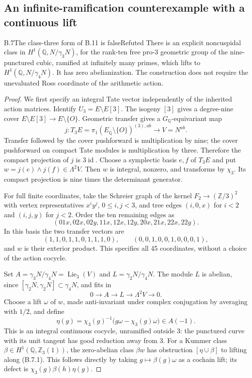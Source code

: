 \subsection{An infinite-ramification counterexample with a continuous lift}

\begin{statement}{B.7}{The class-three form of B.11 is false}{Refuted}
There is an explicit noncuspidal class in
$H^1(\mathbb Q,N/\gamma_3N)$, for the rank-ten free pro-$3$
geometric group of the nine-punctured cubic, ramified at infinitely
many primes, which lifts to $H^1(\mathbb Q,N/\gamma_4N)$.
It has zero abelianization. The construction does not require the
unevaluated Ross coordinate of the arithmetic action.
\end{statement}
\begin{proof}
We first specify an integral Tate vector independently of the inherited
action matrices. Identify $U_3=E\setminus E[3]$. The isogeny $[3]$
gives a degree-nine cover
$E\setminus E[3]\to E\setminus\{O\}$. Geometric transfer gives a
$G_{\mathbb Q}$-equivariant map
\[
 j:T_3E=\pi_1(E_{\overline{\mathbb Q}}\setminus\{O\})^{(3),ab}
       \longrightarrow V=N^{ab}.
\]
Transfer followed by the cover pushforward is multiplication by nine;
the cover pushforward on compact Tate modules is multiplication by
three. Therefore the compact projection of $j$ is $3\operatorname{id}$.
Choose a symplectic basis $e,f$ of $T_3E$ and put
$w=j(e)\wedge j(f)\in\Lambda^2V$. Then $w$ is integral, nonzero,
and transforms by $\chi_3$. Its compact projection is nine times the
determinant generator.

For full finite coordinates, take the Schreier graph of the kernel
$F_2\to(\mathbb Z/3)^2$ with vertex representatives $x^iy^j$,
$0\leq i,j<3$, and tree edges $(i,0,x)$ for $i<2$ and $(i,j,y)$
for $j<2$. Order the ten remaining edges as
\[
 (01x,02x,02y,11x,12x,12y,20x,21x,22x,22y).
\]
In this basis the two transfer vectors are
\[
 (1,1,0,1,1,0,1,1,1,0),\qquad
 (0,0,1,0,0,1,0,0,0,1),
\]
and $w$ is their exterior product. This specifies all 45 coordinates,
without a choice of the action cocycle.

Set $A=\gamma_3N/\gamma_4N=\operatorname{Lie}_3(V)$ and
$L=\gamma_2N/\gamma_4N$. The module $L$ is abelian, since
$[\gamma_2N,\gamma_2N]\subset\gamma_4N$, and fits in
\[
 0\longrightarrow A\longrightarrow L\longrightarrow
 \Lambda^2V\longrightarrow0.                                      \tag{B.7.1}
\]
Choose a lift $\omega$ of $w$, made anti-invariant under complex
conjugation by averaging with $1/2$, and define
\[
 \eta(g)=\chi_3(g)^{-1}\bigl(g\omega-\chi_3(g)\omega\bigr)
       \in A(-1).
\]
This is an integral continuous cocycle, unramified outside $3$:
the punctured curve with its unit tangent has good reduction away
from $3$. For a Kummer class $\beta\in H^1(\mathbb Q,\mathbb Z_3(1))$,
the zero-abelian class $\beta w$ has obstruction $[\eta\cup\beta]$
to lifting along (B.7.1). This follows directly by taking
$g\mapsto\beta(g)\omega$ as a cochain lift; its defect is
$\chi_3(g)\beta(h)\eta(g)$.


\end{proof}
